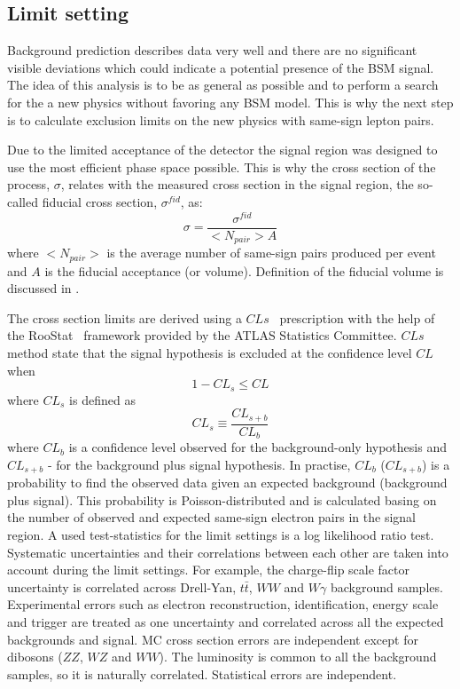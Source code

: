 \subsection{Limit setting}

Background prediction describes data very well and there are no significant visible deviations which could indicate a potential presence of the BSM signal.
The idea of this analysis is to be as general as possible and to perform a search for the a new physics without favoring any BSM model.
This is why the next step is to calculate exclusion limits on the new physics with same-sign lepton pairs.

Due to the limited acceptance of the detector the signal region was designed to use the most efficient phase space possible.
This is why the cross section of the process, $\sigma$, relates with the measured cross section in the signal region, the so-called fiducial cross section, $\sigma^{fid}$, as:
\begin{equation}
 \sigma = \dfrac{\sigma^{fid}}{<N_{pair}>A}
 \label{eq:cross_section}
\end{equation}
where $<N_{pair}>$ is the average number of same-sign pairs produced per event and $A$ is the fiducial acceptance (or volume).
Definition of the fiducial volume is discussed in .

The cross section limits are derived using a $CLs$~\cite{CLs_tecnique,CLs_2} prescription with the help of the RooStat~\cite{RooStat_project} framework 
provided by the ATLAS Statistics Committee. $CLs$ method state that the signal hypothesis is excluded at the confidence level $CL$ when
\begin{equation}
 1 - CL_s \leq CL
\end{equation}
where $CL_s$ is defined as
\begin{equation}
 CL_s \equiv \dfrac{CL_{s+b}}{CL_b}
\end{equation}
where $CL_b$ is a confidence level observed for the background-only hypothesis and $CL_{s+b}$ - for the background plus signal hypothesis.
In practise, $CL_b$ ($CL_{s+b}$) is a probability to find the observed data given an expected background (background plus signal).
This probability is Poisson-distributed and is calculated basing on the number of observed and expected same-sign electron pairs in the signal region.
A used test-statistics for the limit settings is a log likelihood ratio test.
 Systematic uncertainties and their correlations between each other are taken into account during the limit settings.
For example, the charge-flip scale factor uncertainty is correlated across Drell-Yan, $t\bar{t}$, $WW$ and $W\gamma$ background samples.
Experimental errors such as electron reconstruction, identification, energy scale and trigger 
are treated as one uncertainty and correlated across all the expected backgrounds and signal.
MC cross section errors are independent except for dibosons ($ZZ$, $WZ$ and $WW$).
The luminosity is common to all the background samples, so it is naturally correlated.
Statistical errors are independent.

